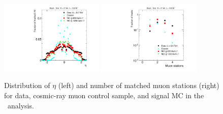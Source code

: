 \begin{figure}
\centering
  \includegraphics[clip=true, trim=0.0cm 0cm 2.8cm 0cm, width=0.44\textwidth]{figures/muonly/Selection_Comp_8TeV_Cosmic_Eta_BS}
  \includegraphics[clip=true, trim=0.0cm 0cm 2.8cm 0cm, width=0.44\textwidth]{figures/muonly/Selection_Comp_8TeV_Cosmic_MatchedStations_BS} \\
\caption[Distribution of $\eta$ and number of matched muon stations for data, cosmic-ray muon control sample, and signal MC in the \muononly\ analysis.]
{Distribution of $\eta$ (left) and number of matched muon stations (right) for data, cosmic-ray muon control sample, and signal MC in the \muononly\ analysis.}
    \label{fig:MuOnlyPreselA}
\end{figure}

